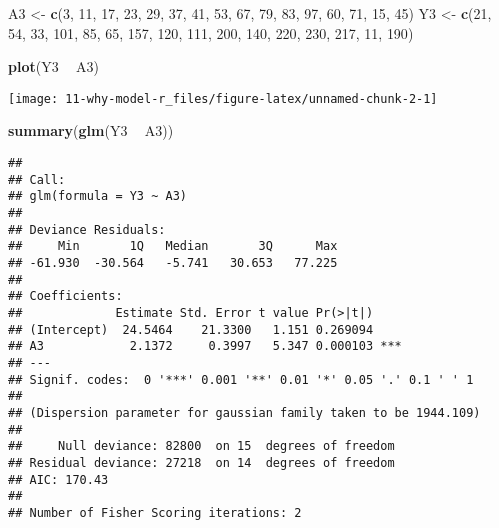 \documentclass[10pt,]{book}
\newenvironment{Shaded}{\begin{snugshade}}{\end{snugshade}}
\newcommand{\DecValTok}[1]{\textcolor[rgb]{0.00,0.00,0.81}{#1}}
\newcommand{\KeywordTok}[1]{\textcolor[rgb]{0.13,0.29,0.53}{\textbf{#1}}}
\newcommand{\NormalTok}[1]{#1}
\newcommand{\OperatorTok}[1]{\textcolor[rgb]{0.81,0.36,0.00}{\textbf{#1}}}
\newcommand{\StringTok}[1]{\textcolor[rgb]{0.31,0.60,0.02}{#1}}
\begin{document}
\begin{Shaded}
\begin{Highlighting}[]
\NormalTok{A3 <-}
\StringTok{  }\KeywordTok{c}\NormalTok{(}\DecValTok{3}\NormalTok{, }\DecValTok{11}\NormalTok{, }\DecValTok{17}\NormalTok{, }\DecValTok{23}\NormalTok{, }\DecValTok{29}\NormalTok{, }\DecValTok{37}\NormalTok{, }\DecValTok{41}\NormalTok{, }\DecValTok{53}\NormalTok{, }\DecValTok{67}\NormalTok{, }\DecValTok{79}\NormalTok{, }\DecValTok{83}\NormalTok{, }\DecValTok{97}\NormalTok{, }\DecValTok{60}\NormalTok{, }\DecValTok{71}\NormalTok{, }\DecValTok{15}\NormalTok{, }\DecValTok{45}\NormalTok{)}
\NormalTok{Y3 <-}
\StringTok{  }\KeywordTok{c}\NormalTok{(}\DecValTok{21}\NormalTok{, }\DecValTok{54}\NormalTok{, }\DecValTok{33}\NormalTok{, }\DecValTok{101}\NormalTok{, }\DecValTok{85}\NormalTok{, }\DecValTok{65}\NormalTok{, }\DecValTok{157}\NormalTok{, }\DecValTok{120}\NormalTok{, }\DecValTok{111}\NormalTok{, }\DecValTok{200}\NormalTok{, }\DecValTok{140}\NormalTok{, }\DecValTok{220}\NormalTok{, }\DecValTok{230}\NormalTok{, }\DecValTok{217}\NormalTok{,}
    \DecValTok{11}\NormalTok{, }\DecValTok{190}\NormalTok{)}

\KeywordTok{plot}\NormalTok{(Y3 }\OperatorTok{~}\StringTok{ }\NormalTok{A3)}
\end{Highlighting}
\end{Shaded}

\begin{center}\texttt{[image: 11-why-model-r\_files/figure-latex/unnamed-chunk-2-1]} \end{center}

\begin{Shaded}
\begin{Highlighting}[]
\KeywordTok{summary}\NormalTok{(}\KeywordTok{glm}\NormalTok{(Y3 }\OperatorTok{~}\StringTok{ }\NormalTok{A3))}
\end{Highlighting}
\end{Shaded}

\begin{verbatim}
## 
## Call:
## glm(formula = Y3 ~ A3)
## 
## Deviance Residuals: 
##     Min       1Q   Median       3Q      Max  
## -61.930  -30.564   -5.741   30.653   77.225  
## 
## Coefficients:
##             Estimate Std. Error t value Pr(>|t|)    
## (Intercept)  24.5464    21.3300   1.151 0.269094    
## A3            2.1372     0.3997   5.347 0.000103 ***
## ---
## Signif. codes:  0 '***' 0.001 '**' 0.01 '*' 0.05 '.' 0.1 ' ' 1
## 
## (Dispersion parameter for gaussian family taken to be 1944.109)
## 
##     Null deviance: 82800  on 15  degrees of freedom
## Residual deviance: 27218  on 14  degrees of freedom
## AIC: 170.43
## 
## Number of Fisher Scoring iterations: 2
\end{verbatim}
\end{document}

